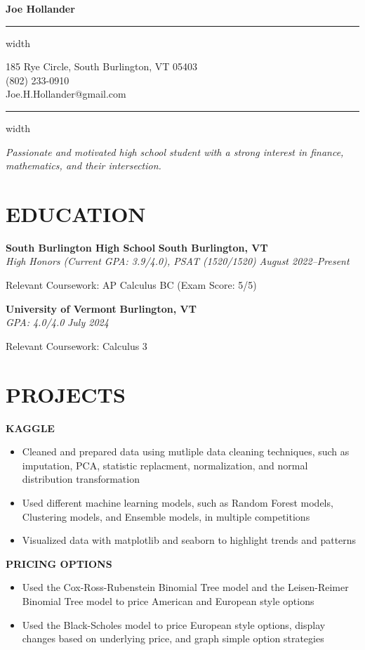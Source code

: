 \documentclass[11pt,letterpaper]{article}
\newcommand{\name}[1]{
  \begin{center}
    \Huge\textbf{#1}
  \end{center}
  \vspace{-0.5em}
  \hrule height 0.4pt width \textwidth
  \vspace{0.5em}
}
\newcommand{\contact}[3]{
  \begin{center}
    #1 \\
    #2 \\
    #3
  \end{center}
  \vspace{-0.5em}
  \hrule height 0.4pt width \textwidth
  \vspace{0.5em}
}
\newcommand{\role}[4]{
  \begin{center}
  \textbf{#1} \hfill \textbf{#2} \\
  \textit{#3} \hfill \textit{#4}
  \end{center}
}
\begin{document}
\name{Joe Hollander}
\vspace{-0.5em}
\contact{185 Rye Circle, South Burlington, VT 05403}{(802) 233-0910}{Joe.H.Hollander@gmail.com}

\vspace{-0.5em}
\begin{center}
\textit{Passionate and motivated high school student with a strong interest in finance, mathematics, and their intersection. }
\end{center}

\section{EDUCATION}

\vspace{0.5em}
\role{South Burlington High School}{South Burlington, VT}{High Honors (Current GPA: 3.9/4.0), PSAT (1520/1520)}{August 2022--Present}   
\begin{flushleft}
Relevant Coursework: AP Calculus BC (Exam Score: 5/5)
\end{flushleft}

\role{University of Vermont}{Burlington, VT}{GPA: 4.0/4.0}{July 2024}
\begin{flushleft}
  Relevant Coursework: Calculus 3
  \end{flushleft}


\section{PROJECTS}
\vspace{1em}

\begin{flushleft}
  \textbf{KAGGLE}
  \begin{itemize}[leftmargin=*,nosep]
    \item Cleaned and prepared data using mutliple data cleaning techniques, such as imputation, PCA, statistic replacment, normalization, and normal distribution transformation
    \item Used different machine learning models, such as Random Forest models, Clustering models, and Ensemble models, in multiple competitions
    \item Visualized data with matplotlib and seaborn to highlight trends and patterns
  \end{itemize}
\end{flushleft}


\begin{flushleft}
  \textbf{PRICING OPTIONS}
  \begin{itemize}[leftmargin=*,nosep] 
    \item Used the Cox-Ross-Rubenstein Binomial Tree model and the Leisen-Reimer Binomial Tree model to price American and European style options
    \item Used the Black-Scholes model to price European style options, display changes based on underlying price, and graph simple option strategies
  \end{itemize}
\end{flushleft}
\end{document}
